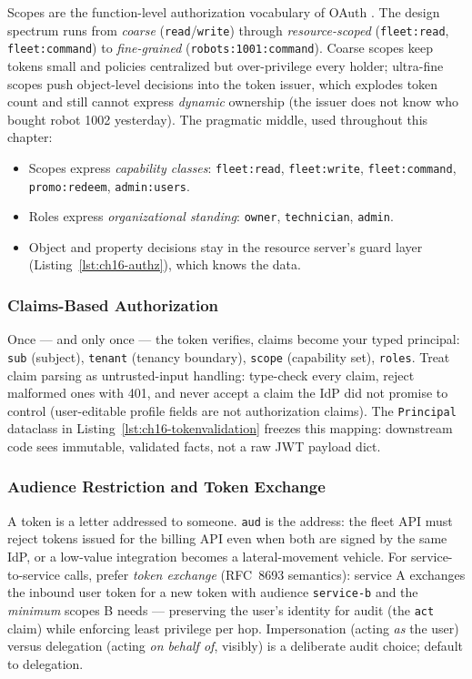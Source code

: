 Scopes are the function-level authorization vocabulary of OAuth
\cite{rfc6749}. The design spectrum runs from \emph{coarse}
(\texttt{read}/\texttt{write}) through \emph{resource-scoped}
(\texttt{fleet:read}, \texttt{fleet:command}) to \emph{fine-grained}
(\texttt{robots:1001:command}). Coarse scopes keep tokens small and policies
centralized but over-privilege every holder; ultra-fine scopes push
object-level decisions into the token issuer, which explodes token count
and still cannot express \emph{dynamic} ownership (the issuer does not know
who bought robot 1002 yesterday). The pragmatic middle, used throughout
this chapter:

\begin{itemize}[itemsep=0.2em]
  \item Scopes express \emph{capability classes}:
        \texttt{fleet:read}, \texttt{fleet:write}, \texttt{fleet:command},
        \texttt{promo:redeem}, \texttt{admin:users}.
  \item Roles express \emph{organizational standing}: \texttt{owner},
        \texttt{technician}, \texttt{admin}.
  \item Object and property decisions stay in the resource server's guard
        layer (Listing~\ref{lst:ch16-authz}), which knows the data.
\end{itemize}

\subsubsection{Claims-Based Authorization}

Once --- and only once --- the token verifies, claims become your typed
principal: \texttt{sub} (subject), \texttt{tenant} (tenancy boundary),
\texttt{scope} (capability set), \texttt{roles}. Treat claim parsing as
untrusted-input handling: type-check every claim, reject malformed ones
with 401, and never accept a claim the IdP did not promise to control
(user-editable profile fields are not authorization claims). The
\texttt{Principal} dataclass in Listing~\ref{lst:ch16-tokenvalidation}
freezes this mapping: downstream code sees immutable, validated facts, not
a raw JWT payload dict.

\subsubsection{Audience Restriction and Token Exchange}

A token is a letter addressed to someone. \texttt{aud} is the address: the
fleet API must reject tokens issued for the billing API even when both are
signed by the same IdP, or a low-value integration becomes a lateral-movement
vehicle. For service-to-service calls, prefer \emph{token exchange}
(RFC~8693 semantics): service A exchanges the inbound user token for a new
token with audience \texttt{service-b} and the \emph{minimum} scopes B
needs --- preserving the user's identity for audit (the \texttt{act} claim)
while enforcing least privilege per hop. Impersonation (acting \emph{as}
the user) versus delegation (acting \emph{on behalf of}, visibly) is a
deliberate audit choice; default to delegation.

